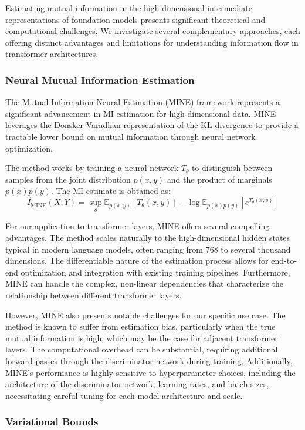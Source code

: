 Estimating mutual information in the high-dimensional intermediate representations of foundation models presents significant theoretical and computational challenges. We investigate several complementary approaches, each offering distinct advantages and limitations for understanding information flow in transformer architectures.

\subsubsection{Neural Mutual Information Estimation}

The Mutual Information Neural Estimation (MINE) framework \citep{belghazi2018mutual} represents a significant advancement in MI estimation for high-dimensional data. MINE leverages the Donsker-Varadhan representation of the KL divergence to provide a tractable lower bound on mutual information through neural network optimization.

The method works by training a neural network $T_\theta$ to distinguish between samples from the joint distribution $p(x,y)$ and the product of marginals $p(x)p(y)$. The MI estimate is obtained as:
\[
\hat{I}_{\text{MINE}}(X;Y) = \sup_\theta \mathbb{E}_{p(x,y)}[T_\theta(x,y)] - \log\mathbb{E}_{p(x)p(y)}[e^{T_\theta(x,y)}]
\]

For our application to transformer layers, MINE offers several compelling advantages. The method scales naturally to the high-dimensional hidden states typical in modern language models, often ranging from 768 to several thousand dimensions. The differentiable nature of the estimation process allows for end-to-end optimization and integration with existing training pipelines. Furthermore, MINE can handle the complex, non-linear dependencies that characterize the relationship between different transformer layers.

However, MINE also presents notable challenges for our specific use case. The method is known to suffer from estimation bias, particularly when the true mutual information is high, which may be the case for adjacent transformer layers. The computational overhead can be substantial, requiring additional forward passes through the discriminator network during training. Additionally, MINE's performance is highly sensitive to hyperparameter choices, including the architecture of the discriminator network, learning rates, and batch sizes, necessitating careful tuning for each model architecture and scale.

\subsubsection{Variational Bounds}

